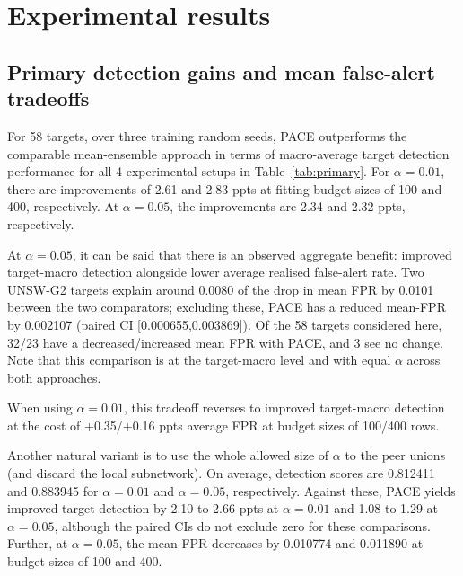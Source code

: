 \section{Experimental results} 
\label{sec:results} 
\subsection{Primary detection gains and mean false-alert tradeoffs} 
For 58 targets, over three training random seeds, PACE outperforms the comparable mean-ensemble approach in terms of macro-average target detection performance for all 4 experimental setups in Table~\ref{tab:primary}. For $\alpha = 0.01$, there are improvements of 2.61 and 2.83 ppts at fitting budget sizes of 100 and 400, respectively. At $\alpha = 0.05$, the improvements are 2.34 and 2.32 ppts, respectively.

At $\alpha = 0.05$, it can be said that there is an observed aggregate benefit: improved target-macro detection alongside lower average realised false-alert rate. Two UNSW-G2 targets explain around 0.0080 of the drop in mean FPR by 0.0101 between the two comparators; excluding these, PACE has a reduced mean-FPR by 0.002107 (paired CI [0.000655,0.003869]). Of the 58 targets considered here, 32/23 have a decreased/increased mean FPR with PACE, and 3 see no change. Note that this comparison is at the target-macro level and with equal $\alpha$ across both approaches.

\begin{table}[!htbp] 
\centering\small 
\caption{Compared against mean-ensemble at the same nominal $\alpha$ (not matched realised FPR). Target detection reported per attack type and target and averaged across all attack types, random seeds and targets. Average realised FPR is taken across random seeds and targets. CIs are at 95\% by the corpus stratified-pair bootstrap, conditional on corpus sizes and targets after averaging over seeds. Peer and new-target corpora are not bootstrapped. Reported values are \%, with difference/gain/CIs reported as percentage point differences. Differences calculated pre-rounding.} 
\label{tab:primary} 
{\setlength{\tabcolsep}{4.8pt}} 
\end{table} 

When using $\alpha = 0.01$, this tradeoff reverses to improved target-macro detection at the cost of +0.35/+0.16 ppts average FPR at budget sizes of 100/400 rows.

Another natural variant is to use the whole allowed size of $\alpha$ to the peer unions (and discard the local subnetwork). On average, detection scores are 0.812411 and 0.883945 for $\alpha = 0.01$ and $\alpha = 0.05$, respectively. Against these, PACE yields improved target detection by 2.10 to 2.66 ppts at $\alpha = 0.01$ and 1.08 to 1.29 at $\alpha = 0.05$, although the paired CIs do not exclude zero for these comparisons. Further, at $\alpha = 0.05$, the mean-FPR decreases by 0.010774 and 0.011890 at budget sizes of 100 and 400.

